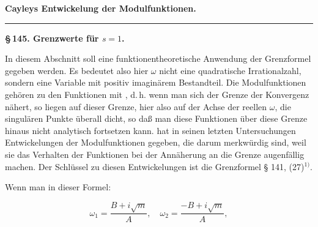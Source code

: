 \begin{center}
{\large{}}

{\Large\textbf{Cayleys Entwickelung der Modulfunktionen.}}

\rule{0.3\textwidth}{0.4pt}

\textbf{\S\,145. Grenzwerte für $s = 1$.}
\end{center}

In diesem Abschnitt soll eine funktionentheoretische Anwendung der Grenzformel gegeben werden. Es bedeutet also hier $\omega$ nicht eine quadratische Irrationalzahl, sondern eine Variable mit positiv imaginärem Bestandteil. Die Modulfunktionen gehören zu den Funktionen mit , d.\,h. wenn man sich der Grenze der Konvergenz nähert, so liegen auf dieser Grenze, hier also auf der Achse der reellen $\omega$, die singulären Punkte überall dicht, so daß man diese Funktionen über diese Grenze hinaus nicht analytisch fortsetzen kann.  hat in seinen letzten Untersuchungen Entwickelungen der Modulfunktionen gegeben, die darum merkwürdig sind, weil sie das Verhalten der Funktionen bei der Annäherung an die Grenze augenfällig machen. Der Schlüssel zu diesen Entwickelungen ist die Grenzformel § 141, (27)$^{1)}$.

Wenn man in dieser Formel:

\[
\omega_1 = \frac{B+i\sqrt m}{A}, \quad \omega_2 = \frac{-B+i\sqrt m}{A},
\]


\begingroup\renewcommand{\thefootnote}{1)}\endgroup
